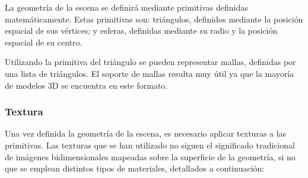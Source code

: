 \documentclass[10pt, a4paper]{article}
\begin{document}
La geometría de la escena se definirá mediante primitivas definidas matemáticamente. Estas primitivas son: triángulos, definidos mediante la posición espacial de sus vértices; y esferas, definidas mediante su radio y la posición espacial de su centro. 

Utilizando la primitiva del triángulo se pueden representar mallas, definidas por una lista de triángulos. El soporte de mallas resulta muy útil ya que la mayoría de modelos 3D se encuentra en este formato. 

\subsubsection{Textura}

Una vez definida la geometría de la escena, es necesario aplicar texturas a las primitivas. Las texturas que se han utilizado no siguen el significado tradicional de imágenes bidimensionales mapeadas sobre la superficie de la geometría, si no que se emplean distintos tipos de materiales, detallados a continuación:
\end{document}
